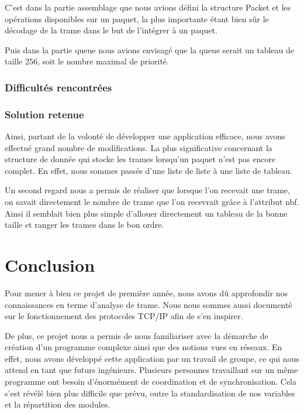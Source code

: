\documentclass[a4paper,11pt]{article}
\begin{document}
C'est dans la partie assemblage que nous avions défini la structure Packet et les opérations disponibles sur un paquet, la plus importante étant bien sûr le décodage de la trame dans le but de l'intégrer à un paquet.

Puis dans la partie queue nous avions envisagé que la queue serait un tableau de taille 256, soit le nombre maximal de priorité. 


\subsubsection{Difficultés rencontrées}



\subsubsection{Solution retenue}

Ainsi, partant de la volonté de développer une application efficace, nous avons effectué grand nombre de modifications. La plus significative concernant la structure de donnée qui stocke les trames lorsqu'un paquet n'est pas encore complet. En effet, nous sommes passés d'une liste de liste à une liste de tableau.

Un second regard nous a permis de réaliser que lorsque l'on recevait une trame, on savait directement le nombre de trame que l'on recevrait grâce à l’attribut nbf. Ainsi il semblait bien plus simple d'allouer directement un tableau de la bonne taille et ranger les trames dans le bon ordre.

\section{Conclusion}

Pour mener à bien ce projet de première année, nous avons dû approfondir nos connaissances en terme d'analyse de trame. Nous nous sommes aussi documenté sur le fonctionnement des protocoles TCP/IP afin de s'en inspirer.

De plus, ce projet nous a permis de nous familiariser avec la démarche de création d’un programme complexe ainsi  que des notions vues en réseaux. En effet, nous avons développé cette application par un travail de groupe, ce qui nous attend en tant que futurs ingénieurs. Plusieurs personnes travaillant sur un même programme ont besoin d'énormément de coordination et de synchronisation. Cela s'est révélé bien plus difficile que prévu, outre la standardisation de nos variables et la répartition des modules.
\end{document}
